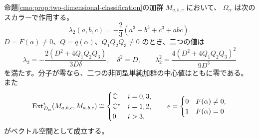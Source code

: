 \begin{proposition}[中心固有値と既約二次元加群の剛性]
\label{cmo:prop:two-dimensional-center-rigidity}
命題\ref{cmo:prop:two-dimensional-classification}の加群 $M_{a,b,c}$ において、
$\Omega_\alpha$ は次のスカラーで作用する。
\begin{equation}\label{cmo:eq:two-dimensional-lambda}
 \lambda_2(a,b,c)=-\frac23(a^3+b^3+c^3+abc).
\end{equation}
$D=F(\alpha)\ne0$、$Q=q(\alpha)$、$Q_1Q_2Q_3\ne0$ のとき、二つの値は
\begin{equation}\label{cmo:eq:two-dimensional-lambda-polynomial}
 \lambda_2=-\frac{2(D^2+4Q_1Q_2Q_3)}{3D\delta},\quad \delta^2=D,
 \qquad
 \lambda_2^2=\frac{4(D^2+4Q_1Q_2Q_3)^2}{9D^3}
\end{equation}
を満たす。分子が零なら、二つの非同型単純加群の中心値はともに零である。
また
\begin{equation}\label{cmo:eq:two-dimensional-self-ext}
 \operatorname{Ext}_{D_\alpha}^i(M_{a,b,c},M_{a,b,c})
 \cong
 \begin{cases}
 \mathbb C&i=0,3,\\
 \mathbb C^{e}&i=1,2,\\
 0&i>3,
 \end{cases}
 \qquad
 e=\begin{cases}0&F(\alpha)\ne0,\\1&F(\alpha)=0\end{cases}
\end{equation}
がベクトル空間として成立する。
\end{proposition}

